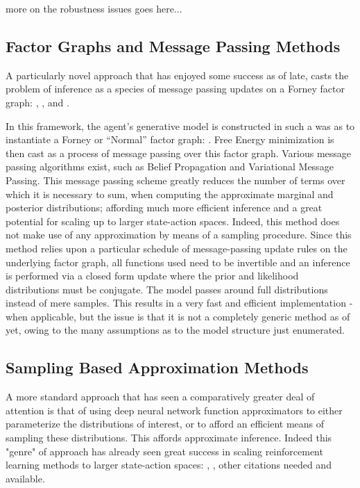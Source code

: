 \documentclass[12pt, oneside]{article}
\begin{document}
more on the robustness issues goes here...

\subsection{Factor Graphs and Message Passing Methods}

A particularly novel approach that has enjoyed some success as of late, casts the problem of inference as a species of message passing updates on a Forney factor graph: \textcite{Factor-Graph-Approach-Automated-Design-Bayesian-Algos}, \textcite{Simulating-AIF-By-Message-Passing}, \textcite{Factor-Graph-Desc-Deep-Temp-AIF} and \textcite{Reactive-MP}. 

In this framework, the agent's generative model is constructed in such a was as to instantiate a Forney or ``Normal'' factor graph: \textcite{Codes-on-Graphs}. Free Energy minimization is then cast as a process of message passing over this factor graph. Various message passing algorithms exist, such as Belief Propagation and Variational Message Passing. This message passing scheme greatly reduces the number of terms over which it is necessary to sum, when computing the approximate marginal and posterior distributions; affording much more efficient inference and a great potential for scaling up to larger state-action spaces. Indeed, this method does not make use of any approximation by means of a sampling procedure. Since this method relies upon a particular schedule of message-passing update rules on the underlying factor graph, all functions used need to be invertible and an inference is performed via a closed form update where the prior and likelihood distributions must be conjugate. The model passes around full distributions instead of mere samples. This results in a very fast and efficient implementation - when applicable, but the issue is that it is not a completely generic method as of yet, owing to the many assumptions as to the model structure just enumerated. 

\subsection{Sampling Based Approximation Methods}

A more standard approach that has seen a comparatively greater deal of attention is that of using deep neural network function approximators to either parameterize the distributions of interest, or to afford an efficient means of sampling these distributions. This affords approximate inference. Indeed this "genre" of approach has already seen great success in scaling reinforcement learning methods to larger state-action spaces: \textcite{Async-Methods-Deep-RL}, \textcite{ATARI-Deep-RL}, other citations needed and available.
\end{document}
